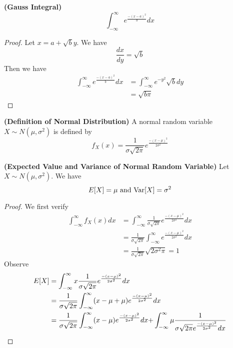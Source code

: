 \documentclass{report}
\begin{document}
\begin{theorem}
\textbf{(Gauss Integral)} 
\begin{equation}
\int_{-\infty}^\infty e^{\frac{-(x-a)^2}{b}}dx
\end{equation}
\end{theorem}
\begin{proof}
Let $x=a+\sqrt{b}y$. We have 
\begin{equation}
\frac{dx}{dy}=\sqrt{b} 
\end{equation}
Then we have
\begin{align}
\int_{-\infty}^\infty e^{\frac{-(x-a)^2}{b}}dx&= \int_{-\infty}^\infty e^{-y^2}\sqrt{b} dy\\
&=\sqrt{b\pi} 
\end{align}
\end{proof}
\begin{definition}
\textbf{(Definition of Normal Distribution)} A normal random variable $X\sim N(\mu,\sigma^2)$ is defined by
\begin{equation}
f_X(x)=\frac{1}{\sigma \sqrt{2\pi} }e^{\frac{-(x-\mu)^2}{2\sigma^2}}
\end{equation}
\end{definition}
\begin{theorem}
\textbf{(Expected Value and Variance of Normal Random Variable)} Let $X\sim N(\mu,\sigma^2)$. We have
\begin{equation}
E[X]=\mu \text{ and }\text{Var} [X]=\sigma^2
\end{equation}
\end{theorem}
\begin{proof}
We first verify 
\begin{align}
\int_{-\infty}^\infty f_X(x)dx&=\int_{-\infty}^\infty \frac{1}{\sigma \sqrt{2\pi} }e^{\frac{-(x-\mu)^2}{2\sigma^2}}dx\\
&=\frac{1}{\sigma \sqrt{2\pi} }\int_{-\infty}^\infty e^{\frac{-(x-\mu)^2}{2\sigma^2}}dx\\
&=\frac{1}{\sigma \sqrt{2\pi} } \sqrt{2\sigma^2 \pi}=1
\end{align}
Observe
\begin{align}
E[X]&=\int_{-\infty}^\infty x \frac{1}{\sigma \sqrt{2\pi} }e^{\frac{-(x-\mu)^2}{2\sigma^2}}dx\\
&=\frac{1}{\sigma \sqrt{2\pi} }\int_{-\infty}^\infty (x-\mu +\mu)e^{\frac{-(x-\mu)^2}{2\sigma^2}}dx\\
&=\frac{1}{\sigma \sqrt{2\pi} }\int_{-\infty}^\infty (x-\mu) e^{\frac{-(x-\mu)^2}{2\sigma ^2}}dx+ }\int_{-\infty}^\infty \mu \frac{1}{\sigma \sqrt{2\pi}e^{\frac{-(x-\mu)^2}{2\sigma^2}}dx\\
\end{align}
\end{proof}
\end{document}
